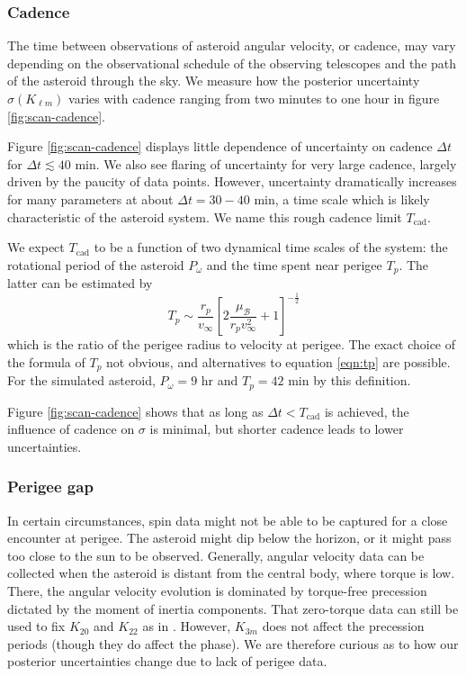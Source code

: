 \documentclass[fleqn,usenatbib]{mnras}
\newcommand{\brackets}[1]{\left[ #1 \right]}
\begin{document}
\subsubsection{Cadence}
\label{sec:scan-cadence}

The time between observations of asteroid angular velocity, or cadence, may vary depending on the observational schedule of the observing telescopes and the path of the asteroid through the sky.  We measure how the posterior uncertainty $\sigma(K_{\ell m})$ varies with cadence ranging from two minutes to one hour in figure \ref{fig:scan-cadence}.

Figure \ref{fig:scan-cadence} displays little dependence of uncertainty on cadence $\Delta t$ for $\Delta t \lesssim 40$ min. We also see flaring of uncertainty for very large cadence, largely driven by the paucity of data points. However, uncertainty dramatically increases for many parameters at about $\Delta t = 30-40$ min, a time scale which is likely characteristic of the asteroid system. We name this rough cadence limit $T_\text{cad}$.

We expect $T_\text{cad}$ to be a function of two dynamical time scales of the system: the rotational period of the asteroid $P_\omega$ and the time spent near perigee $T_p$. The latter can be estimated by
\begin{equation}
  T_p \sim \frac{r_p}{v_\infty}\brackets{2\frac{\mu_\mathcal{B}}{r_pv_\infty^2}+1}^{-\frac{1}{2}}
  \label{eqn:tp}
\end{equation}
which is the ratio of the perigee radius to velocity at perigee. The exact choice of the formula of $T_p$ not obvious, and alternatives to equation \ref{eqn:tp} are possible. For the simulated asteroid, $P_\omega = 9$ hr and $T_p = 42$ min by this definition.


Figure \ref{fig:scan-cadence} shows that as long as $\Delta t < T_\text{cad}$ is achieved, the influence of cadence on $\sigma$ is minimal, but shorter cadence leads to lower uncertainties.



\subsubsection{Perigee gap}
\label{sec:scan-gap}
In certain circumstances, spin data might not be able to be captured for a close encounter at perigee. The asteroid might dip below the horizon, or it might pass too close to the sun to be observed. Generally, angular velocity data can be collected when the asteroid is distant from the central body, where torque is low. There, the angular velocity evolution is dominated by torque-free precession dictated by the moment of inertia components. That zero-torque data can still be used to fix $K_{20}$ and $K_{22}$ as in \cite{MOSKOVITZ2020113519}. However, $K_{3m}$ does not affect the precession periods (though they do affect the phase). We are therefore curious as to how our posterior uncertainties change due to lack of perigee data.
\end{document}
